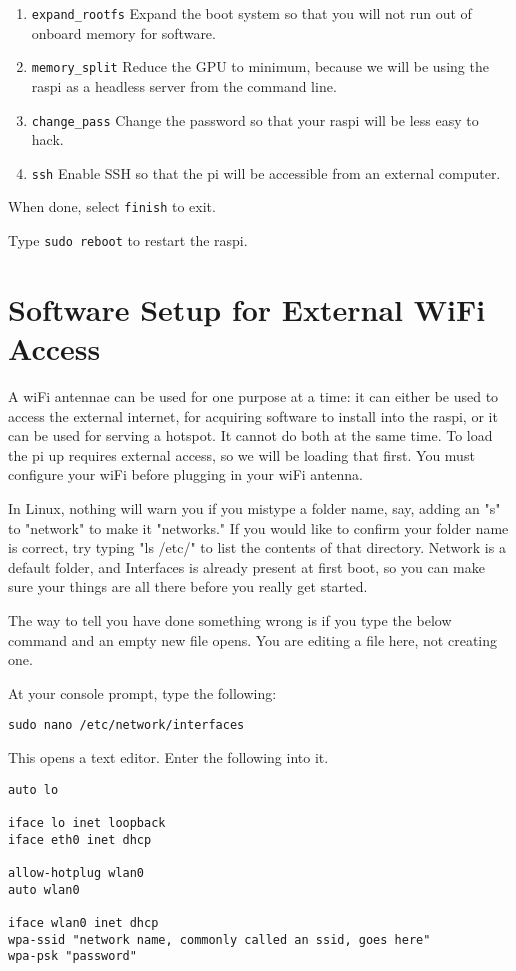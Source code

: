 \begin{enumerate}
\item \texttt{expand_rootfs} Expand the boot system so that you will not run out of onboard memory for software.
\item \texttt{memory_split} Reduce the GPU to minimum, because we will be using the raspi as a headless server from the command line.
\item \texttt{change_pass} Change the password so that your raspi will be less easy to hack.
\item \texttt{ssh} Enable SSH so that the pi will be accessible from an external computer.
\end{enumerate}

When done, select \texttt{finish} to exit. 

Type \texttt{sudo reboot} to restart the raspi.

\section{Software Setup for External WiFi Access}

A wiFi antennae can be used for one purpose at a time: it can either be used to access the external internet, for acquiring software to install into the raspi, or it can be used for serving a hotspot. It cannot do both at the same time. To load the pi up requires external access, so we will be loading that first. You must configure your wiFi before plugging in your wiFi antenna.

In Linux, nothing will warn you if you mistype a folder name, say, adding an "s" to "network" to make it "networks." If you would like to confirm your folder name is correct, try typing "ls /etc/" to list the contents of that directory. Network is a default folder, and Interfaces is already present at first boot, so you can make sure your things are all there before you really get started.

The way to tell you have done something wrong is if you type the below command and an empty new file opens. You are editing a file here, not creating one.

At your console prompt, type the following: 
\begin{lstlisting}
sudo nano /etc/network/interfaces
\end{lstlisting}

This opens a text editor. Enter the following into it.

\begin{lstlisting}
auto lo

iface lo inet loopback
iface eth0 inet dhcp

allow-hotplug wlan0
auto wlan0

iface wlan0 inet dhcp
wpa-ssid "network name, commonly called an ssid, goes here"
wpa-psk "password"
\end{lstlisting}

